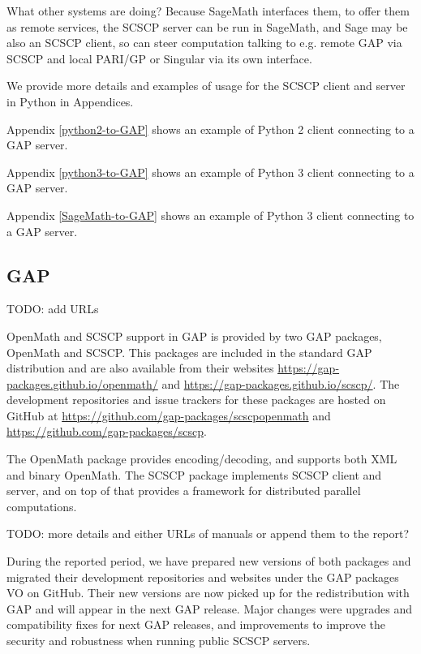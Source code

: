 \documentclass{deliverablereport}
\begin{document}
What other systems are doing? Because SageMath interfaces them, to offer them
as remote services, the SCSCP server can be run in SageMath, and Sage may be
also an SCSCP client, so can steer computation talking to e.g. remote GAP 
via SCSCP and local PARI/GP or Singular via its own interface.

We provide more details and examples of usage for the SCSCP client and server in
Python in Appendices. 

Appendix \ref{python2-to-GAP} shows an example of Python 2 client connecting
to a GAP server.

Appendix \ref{python3-to-GAP} shows an example of Python 3 client connecting
to a GAP server.

Appendix \ref{SageMath-to-GAP} shows an example of Python 3 client connecting
to a GAP server.



\subsection{GAP}

TODO: add URLs

OpenMath and SCSCP support in GAP is provided by two GAP packages, 
{\sf OpenMath} and {\sf SCSCP}. This packages are included in the 
standard GAP distribution and are also available from their 
websites \url{https://gap-packages.github.io/openmath/} and
\url{https://gap-packages.github.io/scscp/}. 
The development repositories and issue trackers for these packages are hosted on GitHub
at \url{https://github.com/gap-packages/scscpopenmath}
and \url{https://github.com/gap-packages/scscp}.

The OpenMath package provides encoding/decoding, and supports both XML and binary OpenMath.
The SCSCP package implements SCSCP client and server, and on top of
that provides a framework for distributed parallel computations.

TODO: more details and either URLs of manuals or append them to the report?

During the reported period, we have prepared new versions of 
both packages and migrated their development repositories and
websites under the GAP packages VO on GitHub. 
Their new versions are now picked up for the redistribution
with GAP and will appear in the next GAP release. Major changes
were upgrades and compatibility fixes for next GAP releases, 
and improvements to improve the security and robustness when
running public SCSCP servers. 
\end{document}
